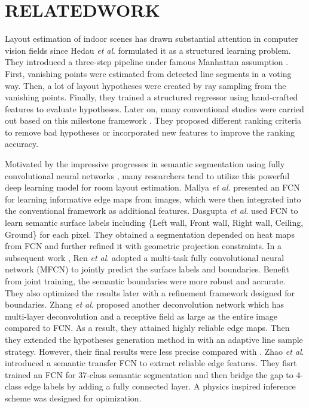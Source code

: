 \section{RELATEDWORK}
\label{sec:Rel}

Layout estimation of indoor scenes has drawn substantial attention in computer vision fields since Hedau \emph{et al}. \cite{hedau2009recovering} formulated it as a structured learning problem. They introduced a three-step pipeline under famous Manhattan assumption \cite{coughlan1999manhattan}. First, vanishing points were estimated from detected line segments in a voting way. Then, a lot of layout hypotheses were created by ray sampling from the vanishing points. Finally, they trained a structured regressor using hand-crafted features to evaluate hypotheses. Later on, many conventional studies were carried out based on this milestone framework \cite{gupta2010estimating, wang2013discriminative,hedau2010thinking,schwing2013box,ramalingam2013manhattan}. They proposed different ranking criteria to remove bad hypotheses or incorporated new features to improve the ranking accuracy. 

Motivated by the impressive progresses in semantic segmentation using fully convolutional neural networks \cite{long2015fully,chen2016deeplab}, many researchers tend to utilize this powerful deep learning model for room layout estimation. 
%
Mallya \emph{et al}. \cite{mallya2015learning} presented an FCN for learning informative edge maps from images, which were then integrated into the conventional framework as additional features. 
%
Dasgupta \emph{et al}. \cite{dasgupta2016delay} used FCN to learn semantic surface labels including \{Left wall, Front wall, Right wall, Ceiling, Ground\} for each pixel. They obtained a segmentation depended on heat maps from FCN and further refined it with geometric projection constraints.
% 
In a subsequent work \cite{ren2016coarse}, Ren \emph{et al}. adopted a multi-task fully convolutional neural network (MFCN) to jointly predict the surface labels and boundaries. Benefit from joint training, the semantic boundaries were more robust and accurate. They also optimized the results later with a refinement framework designed for boundaries.
% 
Zhang \emph{et al}.\cite{zhang2016learning} proposed another deconvolution network which has multi-layer deconvolution and a receptive field as large as the entire image compared to FCN. As a result, they attained highly reliable edge maps. Then they extended the hypotheses generation method in \cite{mallya2015learning} with an adaptive line sample strategy. However, their final results were less precise compared with \cite{dasgupta2016delay,ren2016coarse}.
%
Zhao \emph{et al}. \cite{zhao2017physics} introduced a semantic transfer FCN to extract reliable edge features. They fisrt trained an FCN for 37-class semantic segmentation and then bridge the gap to 4-class edge labels by adding a fully connected layer. A physics inspired inference scheme was designed for opimization. 


